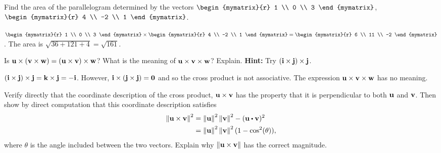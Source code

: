 \begin{enumialphparenastyle}
\begin{ex}
  Find the area of the parallelogram determined by the vectors
  $\begin{mymatrix}{r}
    1 \\
    0 \\
    3
  \end{mymatrix}$, $\begin{mymatrix}{r}
    4 \\
    -2 \\
    1
  \end{mymatrix}$.
  \begin{sol}
    $\begin{mymatrix}{r}
      1 \\
      0 \\
      3
    \end{mymatrix} \times
    \begin{mymatrix}{r}
      4 \\
      -2 \\
      1
    \end{mymatrix} =\begin{mymatrix}{r}
      6 \\
      11 \\
      -2
    \end{mymatrix}$. The area is $\sqrt{36+121+4}= \sqrt{161}$.
  \end{sol}
\end{ex}


\begin{ex}
  Is
  $\mbox{\bf u}\times (\mbox{\bf v}\times\mbox{\bf w}) = (\mbox{\bf u}\times
    \mbox{\bf v})\times\mbox{\bf w}$? What is the meaning of
  $\mbox{\bf u}\times \mbox{\bf v}\times\mbox{\bf w}$? Explain.  \textbf{Hint:}
  Try $(\mbox{\bf i}\times\mbox{\bf j})\times\mbox{\bf j}$.
  \begin{sol}
    $(\mbox{\bf i}\times\mbox{\bf j})\times\mbox{\bf j} = \mbox{\bf k}\times
    \mbox{\bf j}=-\mbox{\bf i}$. However,
    $\mbox{\bf i}\times(\mbox{\bf j}\times\mbox{\bf j}) = \mbox{\bf 0}$ and so
    the cross product is not associative. The expression
    $\mbox{\bf u}\times\mbox{\bf v}\times\mbox{\bf w}$ has no meaning.
  \end{sol}
\end{ex}

\begin{ex}
  Verify directly that the coordinate description of the cross
  product, $\mbox{\bf u}\times \mbox{\bf v}$ has the property that it is
  perpendicular to both $\mbox{\bf u}$ and $\mbox{\bf v}$. Then show by direct
  computation that this coordinate description satisfies
  \begin{align*}
    \norm{\vect{u}\times \vect{v}} ^{2}
    & =\norm{\vect{u}
      } ^{2}\norm{\vect{v}} ^{2}-(\vect{u}\dotprod \vect{v}) ^{2} \\
    & =\norm{\vect{u}} ^{2}\norm{\vect{v}}
      ^{2}(1-\cos ^{2}(\theta)),
  \end{align*}
  where $\theta$ is the angle included between the two
  vectors. Explain why $\left\|\mbox{\bf u}\times\mbox{\bf v}\right\|$ has the
  correct magnitude.
\end{ex}


\end{enumialphparenastyle}
